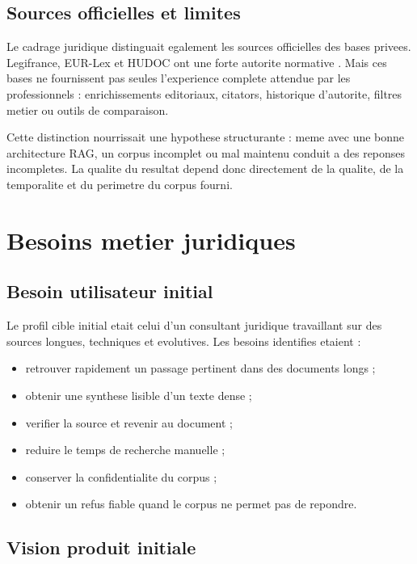 \documentclass[11pt,a4paper]{article}
\begin{document}
\subsection{Sources officielles et limites}

Le cadrage juridique distinguait egalement les sources officielles des bases privees. Legifrance, EUR-Lex et HUDOC ont une forte autorite normative \autocite{legifranceOpenData,eurlex,hudoc}. Mais ces bases ne fournissent pas seules l'experience complete attendue par les professionnels : enrichissements editoriaux, citators, historique d'autorite, filtres metier ou outils de comparaison.

Cette distinction nourrissait une hypothese structurante : meme avec une bonne architecture RAG, un corpus incomplet ou mal maintenu conduit a des reponses incompletes. La qualite du resultat depend donc directement de la qualite, de la temporalite et du perimetre du corpus fourni.

\section{Besoins metier juridiques}

\subsection{Besoin utilisateur initial}

Le profil cible initial etait celui d'un consultant juridique travaillant sur des sources longues, techniques et evolutives. Les besoins identifies etaient :

\begin{itemize}
  \item retrouver rapidement un passage pertinent dans des documents longs ;
  \item obtenir une synthese lisible d'un texte dense ;
  \item verifier la source et revenir au document ;
  \item reduire le temps de recherche manuelle ;
  \item conserver la confidentialite du corpus ;
  \item obtenir un refus fiable quand le corpus ne permet pas de repondre.
\end{itemize}

\subsection{Vision produit initiale}
\end{document}
